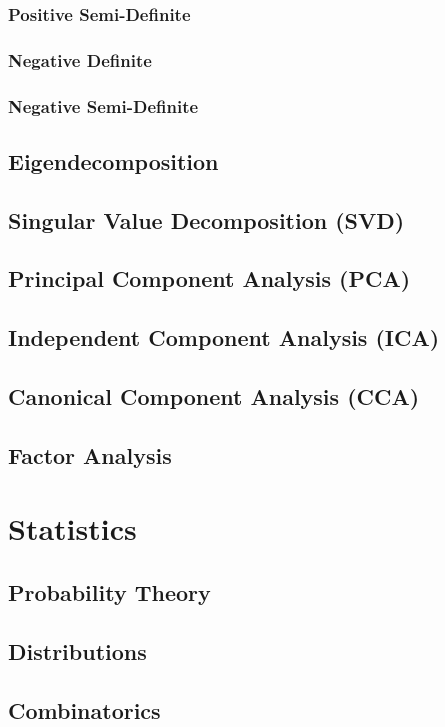 \documentclass[11pt]{article}
\begin{document}
\subsubsection{Positive Semi-Definite}
\subsubsection{Negative Definite}
\subsubsection{Negative Semi-Definite}
\subsection{Eigendecomposition}
\subsection{Singular Value Decomposition (SVD)}
\subsection{Principal Component Analysis (PCA)}
\subsection{Independent Component Analysis (ICA)}
\subsection{Canonical Component Analysis (CCA)}
\subsection{Factor Analysis}

\section{Statistics}
\subsection{Probability Theory}
\subsection{Distributions}
\subsection{Combinatorics}
\end{document}
